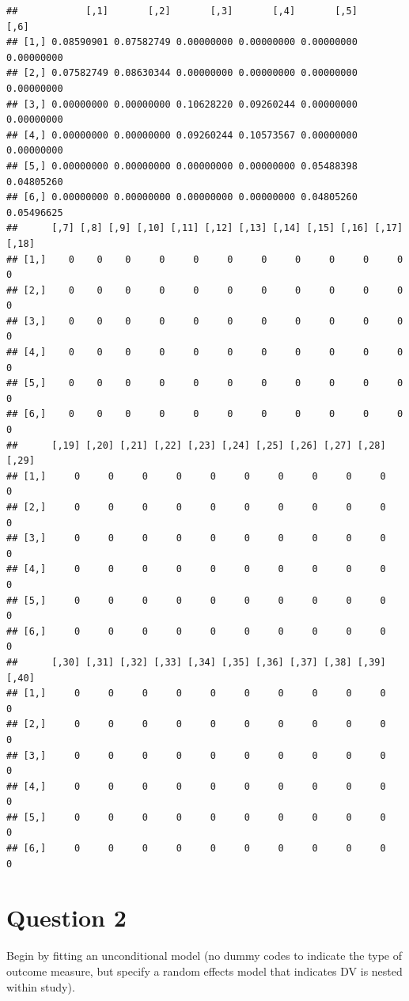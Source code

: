 \documentclass[]{article}
\begin{document}
\begin{verbatim}
##            [,1]       [,2]       [,3]       [,4]       [,5]       [,6]
## [1,] 0.08590901 0.07582749 0.00000000 0.00000000 0.00000000 0.00000000
## [2,] 0.07582749 0.08630344 0.00000000 0.00000000 0.00000000 0.00000000
## [3,] 0.00000000 0.00000000 0.10628220 0.09260244 0.00000000 0.00000000
## [4,] 0.00000000 0.00000000 0.09260244 0.10573567 0.00000000 0.00000000
## [5,] 0.00000000 0.00000000 0.00000000 0.00000000 0.05488398 0.04805260
## [6,] 0.00000000 0.00000000 0.00000000 0.00000000 0.04805260 0.05496625
##      [,7] [,8] [,9] [,10] [,11] [,12] [,13] [,14] [,15] [,16] [,17] [,18]
## [1,]    0    0    0     0     0     0     0     0     0     0     0     0
## [2,]    0    0    0     0     0     0     0     0     0     0     0     0
## [3,]    0    0    0     0     0     0     0     0     0     0     0     0
## [4,]    0    0    0     0     0     0     0     0     0     0     0     0
## [5,]    0    0    0     0     0     0     0     0     0     0     0     0
## [6,]    0    0    0     0     0     0     0     0     0     0     0     0
##      [,19] [,20] [,21] [,22] [,23] [,24] [,25] [,26] [,27] [,28] [,29]
## [1,]     0     0     0     0     0     0     0     0     0     0     0
## [2,]     0     0     0     0     0     0     0     0     0     0     0
## [3,]     0     0     0     0     0     0     0     0     0     0     0
## [4,]     0     0     0     0     0     0     0     0     0     0     0
## [5,]     0     0     0     0     0     0     0     0     0     0     0
## [6,]     0     0     0     0     0     0     0     0     0     0     0
##      [,30] [,31] [,32] [,33] [,34] [,35] [,36] [,37] [,38] [,39] [,40]
## [1,]     0     0     0     0     0     0     0     0     0     0     0
## [2,]     0     0     0     0     0     0     0     0     0     0     0
## [3,]     0     0     0     0     0     0     0     0     0     0     0
## [4,]     0     0     0     0     0     0     0     0     0     0     0
## [5,]     0     0     0     0     0     0     0     0     0     0     0
## [6,]     0     0     0     0     0     0     0     0     0     0     0
\end{verbatim}

\section{Question 2}\label{question-2}

Begin by fitting an unconditional model (no dummy codes to indicate the
type of outcome measure, but specify a random effects model that
indicates DV is nested within study).
\end{document}
